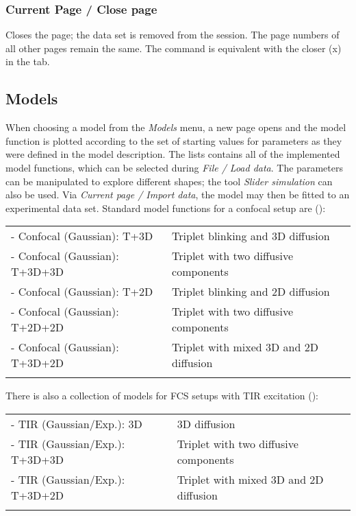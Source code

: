 \subsubsection{Current Page / Close page}
\label{sec:menub.curre.close}
Closes the page; the data set is removed from the session. The page numbers of all other pages remain the same. The command is equivalent with the closer (x) in the tab. 

\subsection{Models}
\label{sec:menub.model}
When choosing a model from the \textit{Models} menu, a new page opens and the model function is plotted according to the set of starting values for parameters as they were defined in the model description. The lists contains all of the implemented model functions, which can be selected during \textit{File / Load data}. The parameters can be manipulated to explore different shapes; the tool \textit{Slider simulation} can also be used. Via \textit{Current page / Import data}, the model may then be fitted to an experimental data set. Standard model functions for a confocal setup are ():

\begin{tabular}{l l}
\rule{0pt}{3ex} - Confocal (Gaussian): T+3D & Triplet blinking and 3D diffusion \\
\rule{0pt}{3ex} - Confocal (Gaussian): T+3D+3D & Triplet with two diffusive components \\
\rule{0pt}{3ex} - Confocal (Gaussian): T+2D &  Triplet blinking and 2D diffusion \\
\rule{0pt}{3ex} - Confocal (Gaussian): T+2D+2D & Triplet with two diffusive components \\
\rule{0pt}{3ex} - Confocal (Gaussian): T+3D+2D &  Triplet with mixed 3D and 2D diffusion \\
\rule{0pt}{3ex}
\end{tabular}

\noindent There is also a collection of models for FCS setups with TIR excitation ():

\begin{tabular}{l l}
\rule{0pt}{3ex} - TIR (Gaussian/Exp.): 3D & 3D diffusion \\
\rule{0pt}{3ex} - TIR (Gaussian/Exp.): T+3D+3D & Triplet with two diffusive components \\
\rule{0pt}{3ex} - TIR (Gaussian/Exp.): T+3D+2D & Triplet with mixed 3D and 2D diffusion \\
\rule{0pt}{3ex}
\end{tabular}

